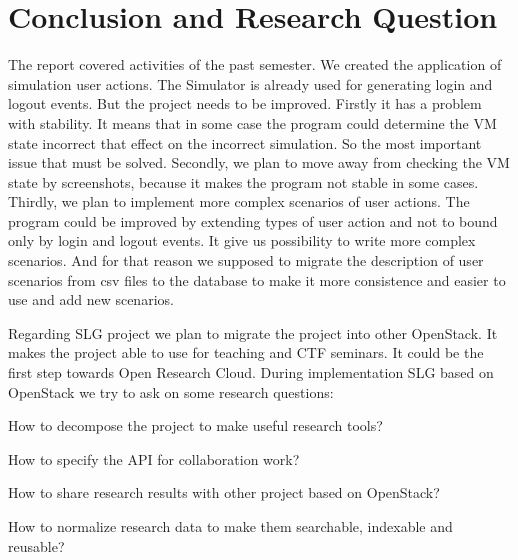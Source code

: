 
\section{Conclusion and Research Question}

The report covered activities of the past semester. We created the application of simulation user actions. The Simulator is already used for generating login and logout events. But the project needs to be improved. Firstly it has a problem with stability. It means that in some case the program could determine the VM state incorrect that effect on the incorrect simulation. So the most important issue that must be solved. Secondly, we plan to move away from checking the VM state by screenshots, because it makes the program not stable in some cases. Thirdly, we plan to implement more complex scenarios of user actions. The program could be improved by extending types of user action and not to bound only by login and logout events. It give us possibility to write more complex scenarios. And for that reason we supposed to migrate the description of user scenarios from csv files to the database to make it more consistence and easier to use and add new scenarios.    

Regarding SLG project we plan to migrate the project into other OpenStack. It makes the project able to use for teaching and CTF seminars. It could be the first step towards Open Research Cloud. During implementation SLG based on OpenStack we try to ask on some research questions: 
\begin{compactitem}
\item How to decompose the project to make useful research tools?
\item How to specify the API for collaboration work?
\item How to share research results with other project based on OpenStack?
\item How to normalize research data to make them searchable, indexable and reusable?  
\end{compactitem}
